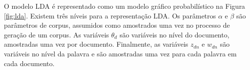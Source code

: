 O modelo LDA é representado como um modelo gráfico probabilístico na Figura \ref{fig:lda}. Existem três níveis para a representação LDA. Os parâmetros $\alpha$ e $\beta$ são parâmetros de corpus, assumidos como amostrados uma vez no processo de geração de um corpus. As variáveis $\theta_d$ são variáveis no nível do documento, amostradas uma vez por documento. Finalmente, as variáveis $z_{dn}$ e $w_{dn}$ são variáveis no nível da palavra e são amostradas uma vez para cada palavra em cada documento.


